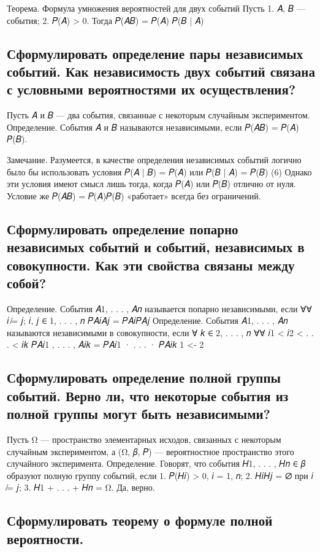 Теорема. Формула умножения вероятностей для двух событий 
Пусть 
1. 𝐴, 𝐵 — события; 
2. 𝑃(𝐴) > 0. 
Тогда 𝑃(𝐴𝐵) = 𝑃(𝐴) 𝑃(𝐵 | 𝐴)



\subsection{Сформулировать определение пары независимых событий. Как независимость двух событий связана с условными вероятностями их осуществления?}

Пусть 𝐴 и 𝐵 — два события, связанные с некоторым случайным экспериментом.
Определение. События 𝐴 и 𝐵 называются независимыми, если 𝑃(𝐴𝐵) = 𝑃(𝐴) 𝑃(𝐵).

Замечание. Разумеется, в качестве определения независимых событий логично было бы использовать условия 𝑃(𝐴 | 𝐵) = 𝑃(𝐴) или 𝑃(𝐵 | 𝐴) = 𝑃(𝐵) (6) Однако эти условия имеют смысл лишь тогда, когда 𝑃(𝐴) или 𝑃(𝐵) отлично от нуля. Условие же 𝑃(𝐴𝐵) = 𝑃(𝐴)𝑃(𝐵) «работает» всегда без ограничений.

\subsection{Сформулировать определение попарно независимых событий и событий, независимых в совокупности. Как эти свойства связаны между собой?}

Определение. События 𝐴1, . . . , 𝐴𝑛 называется попарно независимыми, если
∀∀ 𝑖 ̸= 𝑗; 𝑖, 𝑗 ∈ {1, . . . , 𝑛} 𝑃{𝐴𝑖𝐴𝑗} = 𝑃{𝐴𝑖}𝑃{𝐴𝑗}
Определение. События 𝐴1, . . . , 𝐴𝑛 называются независимыми в совокупности, если 
∀ 𝑘 ∈ {2, . . . , 𝑛} ∀∀ 𝑖1 < 𝑖2 < . . . < 𝑖𝑘 𝑃{𝐴𝑖1 , . . . , 𝐴𝑖𝑘 } = 𝑃{𝐴𝑖1 } · . . . · 𝑃{𝐴𝑖𝑘 }
1 <- 2


\subsection{Сформулировать определение полной группы событий. Верно ли, что некоторые события из полной группы могут быть независимыми?}

Пусть Ω — пространство элементарных исходов, связанных с некоторым случайным экспериментом, а (Ω, 𝛽, 𝑃) — вероятностное пространство этого случайного эксперимента. Определение. Говорят,  что события 𝐻1, . . . , 𝐻𝑛 ∈ 𝛽 образуют полную группу событий, если
1. 𝑃(𝐻𝑖) > 0, 𝑖 = 1, 𝑛; 
2. 𝐻𝑖𝐻𝑗 = ∅ при 𝑖 ̸= 𝑗; 
3. 𝐻1 + . . . + 𝐻𝑛 = Ω.
Да, верно.

\subsection{Сформулировать теорему о формуле полной вероятности.}

